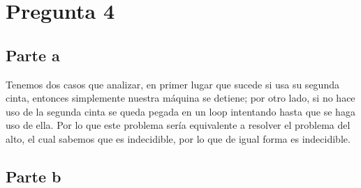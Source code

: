 \documentclass[11pt,letterpaper]{article}
\begin{document}
\section{Pregunta 4}
\subsection{Parte a}
Tenemos dos casos que analizar, en primer lugar que sucede si usa su segunda cinta, entonces simplemente nuestra máquina se detiene; por otro lado, si no hace uso de la segunda cinta se queda pegada en un loop intentando hasta que se haga uso de ella.
Por lo que este problema sería equivalente a resolver el problema del alto, el cual sabemos que es indecidible, por lo que de igual forma es indecidible.

\subsection{Parte b}
\end{document}
